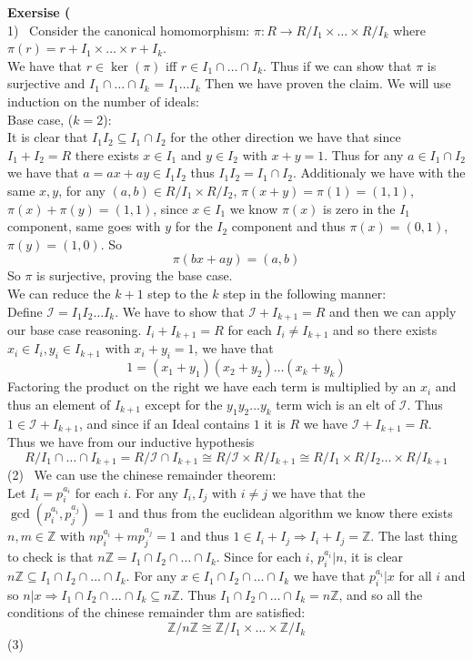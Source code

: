 \documentclass[12pt]{article}
\newenvironment{ques}[1]{\textbf{Exersise #1}\vspace{1 mm}\\ }{\bigskip}
\theoremstyle{definition}
\newcommand{\Z}{\mathbb Z}
\begin{document}
\begin{ques}{3.2}
	(1) \ Consider the canonical homomorphism: 
	$\pi : R \to R/I_1 \times \dots \times R/I_k$ where $\pi(r) = r + I_1
	\times \dots \times r + I_k$.\\
	We have that $r \in \ker(\pi)$ iff $r \in I_1 \cap \dots \cap I_k$. Thus if
	we can show that $\pi$ is surjective and $I_1 \cap \dots \cap I_k$ = $I_1
	\dots I_k$ Then we have proven the claim. We will use induction on the
	number of ideals:\\
	Base case, ($k=2$):\\
	It is clear that $I_1I_2 \subseteq I_1 \cap I_2$ for the other direction we
	have that since $I_1 + I_2 = R$ there exists $x \in I_1$ and $y \in I_2$
	with $x + y = 1$. Thus for any $a \in I_1 \cap I_2$ we have that $a = ax +
	ay \in I_1I_2$ thus $I_1I_2 = I_1 \cap I_2$. Additionaly we have with the same
	$x, y$, for any $(a, b) \in R/I_1 \times R/I_2$, $\pi(x + y) =
	\pi(1) = (1, 1)$, $\pi(x) + \pi(y) = (1, 1)$, since $x \in I_1$ we know
	$\pi(x)$ is zero in the $I_1$ component, same goes with $y$ for the $I_2$
	component and thus $\pi(x) = (0,1)$, $\pi(y) = (1,0)$. So
	$$\pi(bx + ay) =(a, b)$$
	So $\pi$ is surjective, proving the base case.\\
	We can reduce the $k+1$ step to the $k$ step in the following manner:\\
	Define $\mathcal I = I_1 I_2 \dots I_k$. We have to show that
	$\mathcal I + I_{k+1} = R$ and then we can apply our base case reasoning.
	$I_i + I_{k+1} = R$ for each $I_i \neq I_{k+1}$ and so there exists $x_i
	\in I_i, y_i \in I_{k+1}$ with $x_i + y_i = 1$, we have that
	$$1 = (x_1 + y_1)(x_2 + y_2) \dots (x_k + y_k)$$
	Factoring the product on the right we have each term is multiplied by an
	$x_i$ and thus an element of $I_{k+1}$ except for the $y_1y_2 \dots y_k$
	term wich is an elt of $\mathcal I$. Thus $1 \in \mathcal I + I_{k+1}$, and
	since if an Ideal contains $1$ it is $R$ we have $\mathcal I + I_{k+1} = R$.\\
	Thus we have from our inductive hypothesis
	$$R/I_1 \cap \dots \cap I_{k+1} = R/\mathcal I \cap I_{k+1} \cong
	R/\mathcal I \times R/I_{k+1} \cong R/ I_1 \times R/I_2 \dots \times R/I_{k+1} $$
	(2) \ We can use the chinese remainder theorem:\\
	Let $I_i = p_i^{a_i}$ for each $i$. For any $I_i, I_j$ with $i \neq j$ we
	have that the $\gcd (p_i^{a_i},p_j^{a_j}) = 1$ and thus from the euclidean
	algorithm we know there exists $n, m \in \Z$ with $np_i^{a_i} + mp_j^{a_j}
	= 1$ and thus $1 \in I_i + I_j \Rightarrow I_i + I_j = \Z$. The last thing
	to check is that $n\Z = I_1\cap I_2 \cap\dots \cap I_k$. Since for each
	$i$, $p_i^{a_i}|n$, it is clear $n\Z \subseteq I_1\cap I_2 \cap\dots \cap
	I_k$. For any $x \in I_1\cap I_2 \cap\dots \cap I_k$ we have that
	$p_i^{a_i}|x$ for all $i$ and so $n|x \Rightarrow I_1\cap I_2 \cap\dots
	\cap I_k \subseteq n\Z$. Thus $I_1\cap I_2 \cap\dots \cap I_k = n\Z$, and so
	all the conditions of the chinese remainder thm are satisfied:
	$$\Z/n\Z \cong \Z/I_1 \times \dots \times \Z/I_k$$
	(3) \ 


\end{ques}
\end{document}
